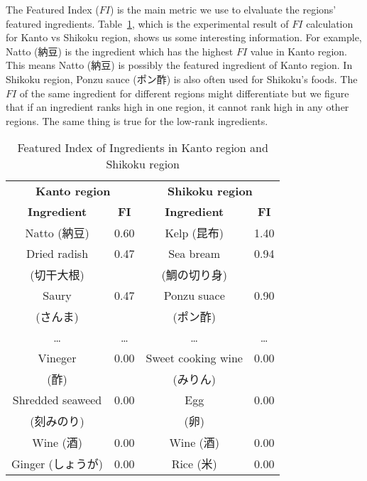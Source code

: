 \begin{CJK}{UTF8}{min}

The Featured Index ($FI$) is the main metric we use to elvaluate the regions' featured ingredients. Table~\ref{tab:FI}, which is the experimental result of $FI$ calculation for Kanto vs Shikoku region, shows us some interesting information. For example, Natto (納豆) is the ingredient which has the highest $FI$ value in Kanto region. This means Natto (納豆) is possibly the featured ingredient of Kanto region. In Shikoku region, Ponzu sauce (ポン酢) is also often used for Shikoku's foods. The $FI$ of the same ingredient for different regions might differentiate but we figure that if an ingredient ranks high in one region, it cannot rank high in any other regions. The same thing is true for the low-rank ingredients.	  

\begin{table}
\centering
\caption{Featured Index of Ingredients in Kanto region and Shikoku region}
\begin{tabular}{|c|c|c|c|}
\hline
\multicolumn{2}{|c|}{\textbf{\large Kanto region}} & \multicolumn{2}{|c|}{\textbf{\large Shikoku region}} \\
\cline{1-4}

\textbf{Ingredient} &	\textbf{ FI} & \textbf{Ingredient} & \textbf{FI}\\ \hline
Natto (納豆)		&0.60 	& Kelp (昆布)		&	1.40\\ \hline
Dried radish 	&0.47 	& Sea bream 	&	0.94\\ 
 (切干大根) & & (鯛の切り身)  & \\ \hline
Saury 	&0.47 	&  Ponzu suace 	& 	0.90\\
(さんま) & & (ポン酢) & \\ \hline
\ldots 		&\ldots 	& \ldots 			& 	\ldots \\ \hline
Vineger		& 0.00 	& Sweet cooking wine 	&	0.00  \\
 (酢)	& & (みりん) & \\ \hline
Shredded seaweed 	&0.00	& Egg 				&	0.00 \\ 
(刻みのり) & & (卵) & \\ \hline
Wine (酒)			&0.00	& Wine (酒)					&	0.00 \\ \hline
Ginger (しょうが) 		&0.00	& Rice (米)					&	0.00 \\ \hline
\end{tabular}

\label{tab:FI}
\end{table} 

\end{CJK}